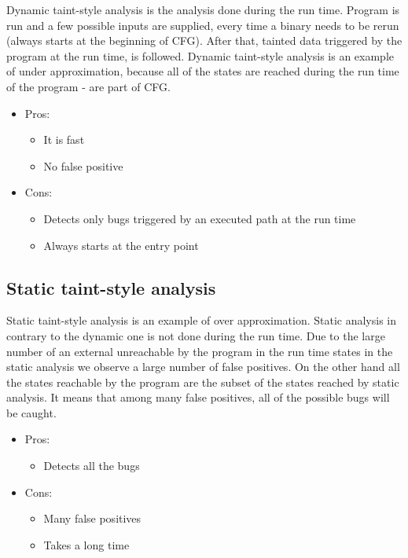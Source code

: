 \documentclass[a4paper, 12pt, journal, onecolumn]{IEEEtran}
\begin{document}
Dynamic taint-style analysis is the analysis done during the run time. Program is run and a few possible inputs are supplied, every time a binary needs to be rerun (always starts at the beginning of CFG). After that, tainted data triggered by the program at the run time, is followed. Dynamic taint-style analysis is an example of under approximation, because all of the states are reached during the run time of the program - are part of CFG. \cite{a6}\cite{a7}

\begin{itemize}
\item Pros:	

\begin{itemize}
\item It is fast	
\item No false positive
\end{itemize}

\item Cons:

\begin{itemize}
\item Detects only bugs triggered by an executed path at the run time
\item Always starts at the entry point
\end{itemize}

\end{itemize}

\subsection{Static taint-style analysis}

Static taint-style analysis is an example of over approximation. Static analysis in contrary to the dynamic one is not done during the run time. Due to the large number of an external unreachable by the program in the run time states in the static analysis we observe a large number of false positives. On the other hand all the states reachable by the program are the subset of the states reached by static analysis. It means that among many false positives, all of the possible bugs will be caught. \cite{a5}\cite{a6}

\begin{itemize}
\item Pros:	

\begin{itemize}
\item Detects all the bugs

\end{itemize}

\item Cons:

\begin{itemize}
\item Many false positives

\item Takes a long time
\end{itemize}

\end{itemize}
\end{document}
